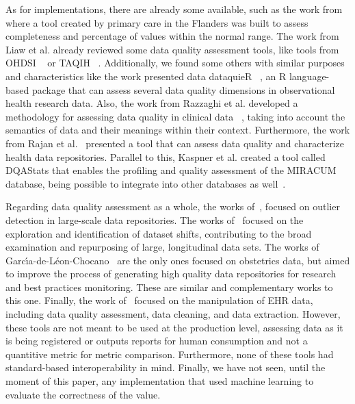 As for implementations, there are already some available, such as the work from \cite{phanAutomatedDataCleaning2020} where a tool created by primary care in the Flanders was built to assess completeness and percentage of values within the normal range. The work from Liaw et al. \cite{liawQualityAssessmentRealworld2021} already reviewed some data quality assessment tools, like tools from OHDSI \unskip~\cite{hripcsakObservationalHealthData2015} or TAQIH \unskip~\cite{alvarezsanchezTAQIHToolTabular2019}. Additionally, we found some others with similar purposes and characteristics like the work presented data dataquieR \unskip~\cite{schmidtFacilitatingHarmonizedData2021}, an R language-based package that can assess several data quality dimensions in observational health research data. Also, the work from Razzaghi et al. developed a methodology for assessing data quality in clinical data \unskip~\cite{razzaghiDevelopingSystematicApproach2022}, taking into account the semantics of data and their meanings within their context. Furthermore, the work from Rajan et al.\unskip~\cite{rajanContentAgnosticComputable2019} presented a tool that can assess data quality and characterize health data repositories. Parallel to this, Kaspner et al. created a tool called DQAStats that enables the profiling and quality assessment of the MIRACUM database, being possible to integrate into other databases as well\unskip~\cite{kapsnerLinkingConsortiumWideData2021a}.


Regarding data quality assessment as a whole, the works of\unskip~\cite{estiriSemisupervisedEncodingOutlier2019}, focused on outlier detection in large-scale data repositories. The works of\unskip~\cite{saezEHRtemporalVariabilityDelineatingTemporal2020} focused on the exploration and identification of dataset shifts, contributing to the broad examination and repurposing of large, longitudinal data sets. The works of Garc\'{\i}a-de-L{\'e}on-Chocano\unskip~\cite{garci;a-de-leon-chocanoConstructionQualityassuredInfant2015,garcia-de-leon-chocanoConstructionQualityassuredInfant2016,saStandardizedDataQuality2017} are the only ones focused on obstetrics data, but aimed to improve the process of generating high quality data repositories for research and best practices monitoring. These are similar and complementary works to this one. Finally, the work of\unskip~\cite{springateREHRPackageManipulating2017} focused on the manipulation of EHR data, including data quality assessment, data cleaning, and data extraction. However, these tools are not meant to be used at the production level, assessing data as it is being registered or outputs reports for human consumption and not a quantitive metric for metric comparison. Furthermore, none of these tools had standard-based interoperability in mind. Finally, we have not seen, until the moment of this paper, any implementation that used machine learning to evaluate the correctness of the value.

